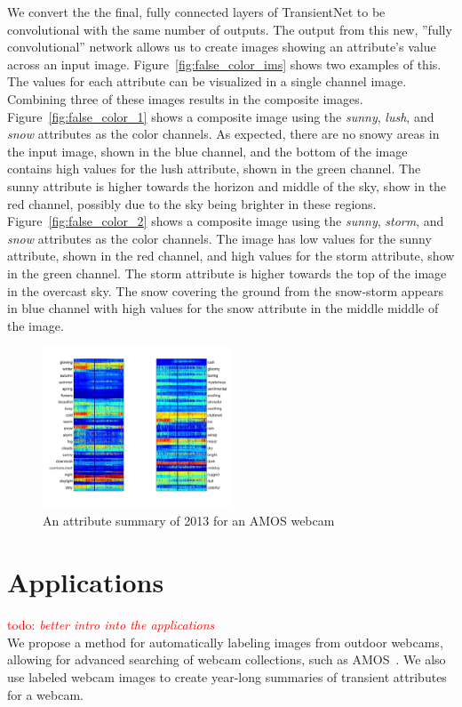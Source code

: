 \documentclass[10pt,twocolumn,letterpaper]{article}
\newcommand{\todo}[1]{\textcolor{red}{todo: {\em #1}}}
\newcommand{\figref}[1]{Figure~\ref{fig:#1}}
\begin{document}
We convert the the final, fully connected layers of TransientNet to be
convolutional with the same number of outputs.  The output from this new,
''fully convolutional'' network allows us to create images showing an
attribute's value across an input image.  \figref{false_color_ims} shows two
examples of this.  The values for each attribute can be visualized in a single
channel image.  Combining three of these images results in the composite
images.  \figref{false_color_1} shows a composite image using the
\textit{sunny}, \textit{lush}, and \textit{snow} attributes as the color
channels.  As expected, there are no snowy areas in the input image, shown
in the blue channel, and the bottom of the image contains high values for the
lush attribute, shown in the green channel.  The sunny attribute is higher 
towards the horizon and middle of the sky, show in the red channel, possibly 
due to the sky being brighter in these regions.  \figref{false_color_2} shows
a composite image using the \textit{sunny}, \textit{storm}, and \textit{snow}
attributes as the color channels.  The image has low values for the sunny
attribute, shown in the red channel, and high values for the storm attribute,
show in the green channel.  The storm attribute is higher towards the top
of the image in the overcast sky.  The snow covering the ground from the 
snow-storm appears in blue channel with high values for the snow attribute in
the middle middle of the image.

\begin{figure}[t]
	\centering
		\includegraphics[width=0.5\textwidth, trim= 5mm 15mm 0mm 10mm]{figs/summary_260.pdf}
		\caption{An attribute summary of 2013 for an AMOS webcam}
		\label{fig:webcam_summary}
\end{figure}

\section{Applications}
\todo{better intro into the applications} \\
\indent
We propose a method for automatically labeling images from outdoor webcams, allowing for
advanced searching of webcam collections, such as AMOS~\cite{jacobs07amos}. We
also use labeled webcam images to create year-long summaries of transient 
attributes for a webcam.
\end{document}
